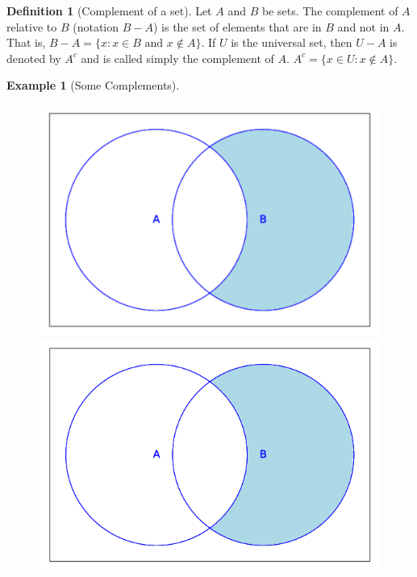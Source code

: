 \documentclass[10pt,]{book}
\theoremstyle{plain}
\theoremstyle{definition}
\newtheorem{definition}[theorem]{Definition}
\theoremstyle{definition}
\theoremstyle{definition}
\newtheorem{example}[theorem]{Example}
\theoremstyle{definition}
\begin{document}
\begin{definition}[Complement of a set]\label{set_complement.}
\label{notation-8}
\label{notation-9}
Let \( A\) and \( B\) be sets. The complement of \( A\) relative to \( B\) (notation
\(B - A\)) is the set of elements that are in \( B\) and not in \( A\). That is, \(B-A=\{x: x\in B \textrm{ and } x\notin A\}\). If \(
U\) is the universal set, then \(U-A\) is denoted by \(A^c\) and is called simply the complement of \( A\). \(A^c=\{x\in U : x\notin A\}\). 
%
\end{definition}
\begin{example}[Some Complements]\label{complements}
\leavevmode%
\begin{figure}
\centering
{}%
{\includegraphics[width=1\linewidth]{images/sageplot-venn-complement1.pdf}}%
{\includegraphics[width=1\linewidth]{images/sageplot-venn-complement1.png}}

\end{figure}
\end{example}
\end{document}
